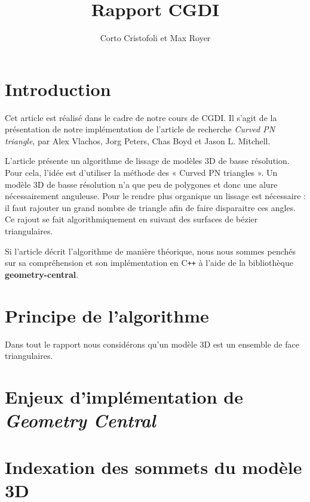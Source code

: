 \documentclass{article}
\title{Rapport CGDI}
\author{Corto Cristofoli et Max Royer}
\def\Cpp{C\texttt{++} }
\begin{document}
\maketitle



\section{Introduction}
Cet article est réalisé dans le cadre de notre cours de CGDI.
Il s'agit de la présentation de notre implémentation de l'article
de recherche \textit{Curved PN triangle}, par Alex Vlachos, Jorg Peters,
Chas Boyd et Jason L. Mitchell.

L'article présente un algorithme de lissage de modèles 3D de basse résolution.
Pour cela, l'idée est d'utiliser la méthode des « Curved PN triangles ». Un
modèle 3D de basse résolution n'a que peu de polygones et donc une alure
nécessairement anguleuse. Pour le rendre plus organique un lissage est
nécessaire : il faut rajouter un grand nombre de triangle afin de faire
disparaitre ces angles. Ce rajout se fait algorithmiquement en suivant des
surfaces de bézier triangulaires.

Si l'article décrit l'algorithme de manière théorique, nous nous sommes penchés
sur sa compréhension et son implémentation en \Cpp à l'aide de la
bibliothèque \textbf{geometry-central}.


\section{Principe de l'algorithme}
Dans tout le rapport nous considérons qu'un modèle 3D est un ensemble de face
triangulaires.

\section{Enjeux d'implémentation de \textit{Geometry Central}}

\section{Indexation des sommets du modèle 3D}

\end{document}
